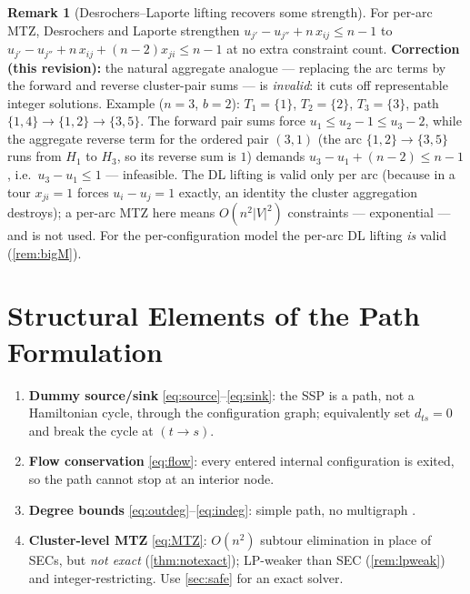 \documentclass[11pt,a4paper]{article}
\theoremstyle{plain}
\theoremstyle{definition}
\newtheorem{remark}[theorem]{Remark}
\begin{document}
\begin{remark}[Desrochers--Laporte lifting recovers some strength]
	\label{rem:dl}
	For per-arc MTZ, Desrochers and Laporte \cite{DesrochersLaporte1991} strengthen
	$u_{j'}-u_{j''}+n\,x_{ij}\le n-1$ to
	$u_{j'}-u_{j''}+n\,x_{ij}+(n-2)x_{ji}\le n-1$ at no extra constraint count.
	\textbf{Correction (this revision):} the natural aggregate analogue --- replacing the arc
	terms by the forward and reverse cluster-pair sums --- is \emph{invalid}: it cuts off
	representable integer solutions. Example ($n=3$, $b=2$): $T_1=\{1\}$, $T_2=\{2\}$,
	$T_3=\{3\}$, path $\{1,4\}\to\{1,2\}\to\{3,5\}$. The forward pair sums force
	$u_1\le u_2-1\le u_3-2$, while the aggregate reverse term for the ordered pair $(3,1)$
	(the arc $\{1,2\}\to\{3,5\}$ runs from $H_1$ to $H_3$, so its reverse sum is $1$) demands
	$u_3-u_1+(n-2)\le n-1$, i.e.\ $u_3-u_1\le1$ --- infeasible. The DL lifting is valid only
	per arc (because in a tour $x_{ji}=1$ forces $u_i-u_j=1$ exactly, an identity the
	cluster aggregation destroys); a per-arc MTZ here means $O(n^{2}|V|^{2})$ constraints ---
	exponential --- and is not used. For the per-configuration model the per-arc DL lifting
	\emph{is} valid (\cref{rem:bigM}).
\end{remark}

\section{Structural Elements of the Path Formulation}
\label{sec:structure}

\begin{enumerate}[label=(\arabic*)]
	\item \textbf{Dummy source/sink} \eqref{eq:source}--\eqref{eq:sink}: the SSP is a path,
	not a Hamiltonian cycle, through the configuration graph; equivalently set $d_{ts}=0$ and
	break the cycle at $(t\to s)$.
	\item \textbf{Flow conservation} \eqref{eq:flow}: every entered internal configuration is
	exited, so the path cannot stop at an interior node.
	\item \textbf{Degree bounds} \eqref{eq:outdeg}--\eqref{eq:indeg}: simple path, no
	multigraph \cite{Applegate2006}.
	\item \textbf{Cluster-level MTZ} \eqref{eq:MTZ}: $O(n^{2})$ subtour elimination in place of
	SECs, but \emph{not exact} (\cref{thm:notexact}); LP-weaker than SEC
	(\cref{rem:lpweak}) and integer-restricting. Use \cref{sec:safe} for an exact solver.
\end{enumerate}
\end{document}
